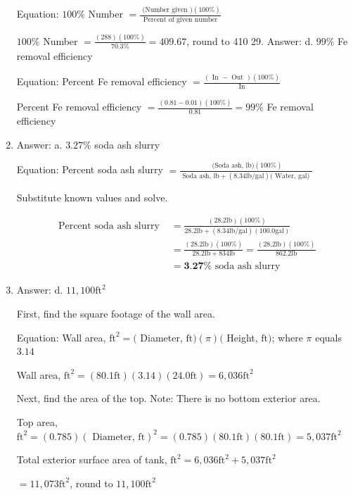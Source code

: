 \documentclass[10pt]{article}
\begin{document}
\begin{enumerate}
Equation: $100 \%$ Number $=\frac{\text { (Number given })(100 \%)}{\text { Percent of given number }}$

$100 \%$ Number $=\frac{(288)(100 \%)}{70.3 \%}=409.67$, round to 410 29. Answer: d. $99 \%$ Fe removal efficiency

Equation: Percent Fe removal efficiency $=\frac{(\text { In }-\text { Out })(100 \%)}{\text { In }}$

Percent Fe removal efficiency $=\frac{(0.81-0.01)(100 \%)}{0.81}=99 \%$ Fe removal efficiency

  \item Answer: a. $3.27 \%$ soda ash slurry

Equation: Percent soda ash slurry $=\frac{\text { (Soda ash, } \mathrm{lb})(100 \%)}{\text { Soda ash, } \mathrm{lb}+(8.34 \mathrm{lb} / \mathrm{gal})(\text { Water, gal) }}$

Substitute known values and solve.

$$
\begin{aligned}
\text { Percent soda ash slurry } &=\frac{(28.2 \mathrm{lb})(100 \%)}{28.2 \mathrm{lb}+(8.34 \mathrm{lb} / \mathrm{gal})(100.0 \mathrm{gal})} \\
&=\frac{(28.2 \mathrm{lb})(100 \%)}{28.2 \mathrm{lb}+834 \mathrm{lb}}=\frac{(28.2 \mathrm{lb})(100 \%)}{862.2 \mathrm{lb}} \\
&=\mathbf{3 . 2 7 \%} \text { soda ash slurry }
\end{aligned}
$$

  \item Answer: d. $11,100 \mathrm{ft}^{2}$

First, find the square footage of the wall area.

Equation: Wall area, $\mathrm{ft}^{2}=($ Diameter, $\mathrm{ft})(\pi)($ Height, $\mathrm{ft})$; where $\pi$ equals $3.14$

Wall area, $\mathrm{ft}^{2}=(80.1 \mathrm{ft})(3.14)(24.0 \mathrm{ft})=6,036 \mathrm{ft}^{2}$

Next, find the area of the top. Note: There is no bottom exterior area.

Top area, $\mathrm{ft}^{2}=(0.785)(\text { Diameter, } \mathrm{ft})^{2}=(0.785)(80.1 \mathrm{ft})(80.1 \mathrm{ft})=5,037 \mathrm{ft}^{2}$

Total exterior surface area of tank, $\mathrm{ft}^{2}=6,036 \mathrm{ft}^{2}+5,037 \mathrm{ft}^{2}$

$=11,073 \mathrm{ft}^{2}$, round to $11,100 \mathrm{ft}^{2}$


\end{enumerate}
\end{document}
